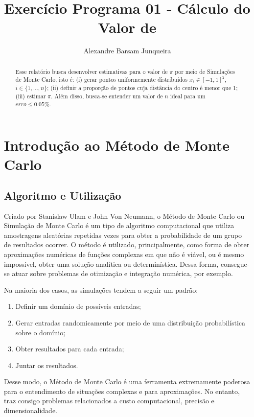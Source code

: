 \documentclass{article}
\title{Exercício Programa 01 - Cálculo do Valor de \pi}
\author{Alexandre Barsam Junqueira}
\begin{document}
\maketitle

\begin{abstract}
Esse relatório busca desenvolver estimativas para o valor de $\pi$ por meio de Simulações de Monte Carlo, isto é: (i) gerar pontos uniformemente distribuídos $x_{i}\in[−1,1]^{2}$, $i\in\{1,…,n\}$; (ii) definir a proporção de pontos cuja distância do centro é menor que 1; (iii) estimar $\pi$. Além disso, busca-se entender um valor de $n$ ideal para um $erro \leq 0.05\%$.
\end{abstract}

\section{Introdução ao Método de Monte Carlo}

\subsection{Algoritmo e Utilização}

Criado por Stanislaw Ulam e John Von Neumann, o Método de Monte Carlo ou Simulação de Monte Carlo é um tipo de algoritmo computacional que utiliza amostragens aleatórias repetidas vezes para obter a probabilidade de um grupo de resultados ocorrer. O método é utilizado, principalmente, como forma de obter aproximações numéricas de funções complexas em que não é viável, ou é mesmo impossível, obter uma solução analítica ou determinística. Dessa forma, consegue-se atuar sobre problemas de otimização e integração numérica, por exemplo.

Na maioria dos casos, as simulações tendem a seguir um padrão:

\begin{enumerate}
    \item Definir um domínio de possíveis entradas;
    \item Gerar entradas randomicamente por meio de uma distribuição probabilística sobre o domínio;
    \item Obter resultados para cada entrada;
    \item Juntar os resultados.
\end{enumerate}

Desse modo, o Método de Monte Carlo é uma ferramenta extremamente poderosa para o entendimento de situações complexas e para aproximações. No entanto, traz consigo problemas relacionados a custo computacional, precisão e dimensionalidade.
\end{document}
